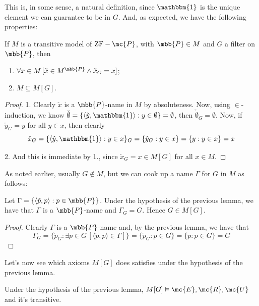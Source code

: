 This is, in some sense, a natural definition, since $\mathbbm{1}$ is the unique element we can guarantee to be in $G$. And, as expected, we have the following properties:

\begin{lemma}{}{}\label{lemma_with_hypothesis}
    If $M$ is a transitive model of $\text{ZF}-\mc{P}$, with $\mbb{P}\in M$ and $G$ a filter on $\mbb{P}$, then
    \begin{enumerate}
        \item $\forall x\in M\,[\check{x}\in M^{\mbb{P}}\wedge\check{x}_G=x]$;
        \item $M\subseteq M[G]$.
    \end{enumerate}
\end{lemma}

\begin{proof}
    1. Clearly $\check{x}$ is a $\mbb{P}$-name in $M$ by absoluteness. Now, using $\in$-induction, we know $\check{\emptyset}=\{\langle\check{y},\mathbbm{1}\rangle:y\in\emptyset\}=\emptyset$, then $\check{\emptyset}_G=\emptyset$. Now, if $\check{y}_G=y$ for all $y\in x$, then clearly
    $$\check{x}_G=\{\langle\check{y},\mathbbm{1}\rangle:y\in x\}_G=\{\check{y}_G:y\in x\}=\{y:y\in x\}=x$$

    2. And this is immediate by 1., since $\check{x}_G=x\in M[G]$ for all $x\in M$.
\end{proof}

As noted earlier, usually $G\notin M$, but we can cook up a name $\Gamma$ for $G$ in $M$ as follows:

\begin{corollary}{}{}
    Let $\Gamma=\{\langle\check{p},p\rangle:p\in\mbb{P}\}$. Under the hypothesis of the previous lemma, we have that $\Gamma$ is a $\mbb{P}$-name and $\Gamma_G=G$. Hence $G\in M[G]$.
\end{corollary}

\begin{proof}
    Clearly $\Gamma$ is a $\mbb{P}$-name and, by the previous lemma, we have that
    $$\Gamma_G=\{\check{p}_G:\exists p\in G\,[\langle\check{p},p\rangle\in\Gamma]\}=\{\check{p}_G:p\in G\}=\{p:p\in G\}=G$$
\end{proof}

Let's now see which axioms $M[G]$ does satisfies under the hypothesis of the previous lemma.

\begin{lemma}{}{}
    Under the hypothesis of the previous lemma, $M[G]\vDash \mc{E},\mc{R},\mc{U}$ and it's transitive.
\end{lemma}

